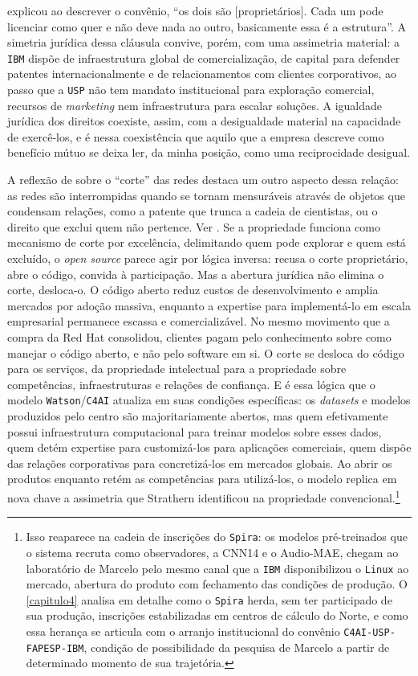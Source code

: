 explicou ao descrever o convênio, \enquote{os dois são [proprietários]. Cada um pode licenciar como quer e não deve nada ao outro, basicamente essa é a estrutura}. A simetria jurídica dessa cláusula convive, porém, com uma assimetria material: a \texttt{IBM} dispõe de infraestrutura global de comercialização, de capital para defender patentes internacionalmente e de relacionamentos com clientes corporativos, ao passo que a \texttt{USP} não tem mandato institucional para exploração comercial, recursos de \textit{marketing} nem infraestrutura para escalar soluções. A igualdade jurídica dos direitos coexiste, assim, com a desigualdade material na capacidade de exercê-los, e é nessa coexistência que aquilo que a empresa descreve como benefício mútuo se deixa ler, da minha posição, como uma reciprocidade desigual.

A reflexão de \textcite{strathern2011cortando} sobre o \enquote{corte} das redes destaca um outro aspecto dessa relação: as redes são interrompidas quando se tornam mensuráveis através de objetos que condensam relações, como a patente que trunca a cadeia de cientistas, ou o direito que exclui quem não pertence. Ver \textcite{strathern2011cortando}. Se a propriedade funciona como mecanismo de corte por excelência, delimitando quem pode explorar e quem está excluído, o \textit{open source} parece agir por lógica inversa: recusa o corte proprietário, abre o código, convida à participação. Mas a abertura jurídica não elimina o corte, desloca-o. O código aberto reduz custos de desenvolvimento e amplia mercados por adoção massiva, enquanto a expertise para implementá-lo em escala empresarial permanece escassa e comercializável. No mesmo movimento que a compra da Red Hat consolidou, clientes pagam pelo conhecimento sobre como manejar o código aberto, e não pelo software em si. O corte se desloca do código para os serviços, da propriedade intelectual para a propriedade sobre competências, infraestruturas e relações de confiança. E é essa lógica que o modelo \texttt{Watson}/\texttt{C4AI} atualiza em suas condições específicas: os \textit{datasets} e modelos produzidos pelo centro são majoritariamente abertos, mas quem efetivamente possui infraestrutura computacional para treinar modelos sobre esses dados, quem detém expertise para customizá-los para aplicações comerciais, quem dispõe das relações corporativas para concretizá-los em mercados globais. Ao abrir os produtos enquanto retém as competências para utilizá-los, o modelo replica em nova chave a assimetria que Strathern identificou na propriedade convencional.\footnote{Isso reaparece na cadeia de inscrições do \texttt{Spira}: os modelos pré-treinados que o sistema recruta como observadores, a CNN14 e o Audio-MAE, chegam ao laboratório de Marcelo pelo mesmo canal que a \texttt{IBM} disponibilizou o \texttt{Linux} ao mercado, abertura do produto com fechamento das condições de produção. O \autoref{capitulo4} analisa em detalhe como o \texttt{Spira} herda, sem ter participado de sua produção, inscrições estabilizadas em centros de cálculo do Norte, e como essa herança se articula com o arranjo institucional do convênio \texttt{C4AI-USP-FAPESP-IBM}, condição de possibilidade da pesquisa de Marcelo a partir de determinado momento de sua trajetória.}

